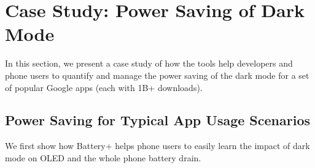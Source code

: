 
\section{Case Study: Power Saving of Dark Mode}
\label{sec:casedark}



In this section, we present a case study of
how the tools help developers and phone users to quantify and manage
the power saving of the dark mode for a set of popular
Google apps
(each with 1B+ downloads).



\subsection{Power Saving for Typical App Usage Scenarios}
\label{subsec:mainresults}

We first show how Battery+ helps phone users to easily learn the
impact of dark mode on OLED and the whole phone battery drain.

